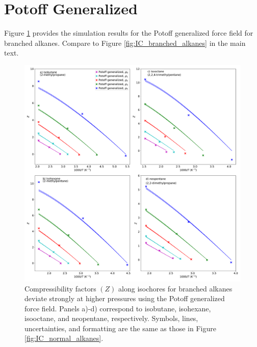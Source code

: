 \documentclass[journal=jctc,manuscript=article]{achemso}
\begin{document}
\section{Potoff Generalized} \label{Potoff Generalized}

Figure \ref{fig:IC_branched_alkanes_supporting_information} provides the simulation results for the Potoff generalized force field for branched alkanes. Compare to Figure \ref{fig:IC_branched_alkanes} in the main text.

\begin{figure}[H]
	\centering
	\includegraphics[width=6.2in]{IC_branched_alkanes_supporting_information}
	\caption{Compressibility factors $(Z)$ along isochores for branched alkanes deviate strongly at higher pressures using the Potoff generalized force field. Panels a)-d) correspond to isobutane, isohexane, isooctane, and neopentane, respectively. Symbols, lines, uncertainties, and formatting are the same as those in Figure \ref{fig:IC_normal_alkanes}.}
	\label{fig:IC_branched_alkanes_supporting_information}
\end{figure}
\end{document}
